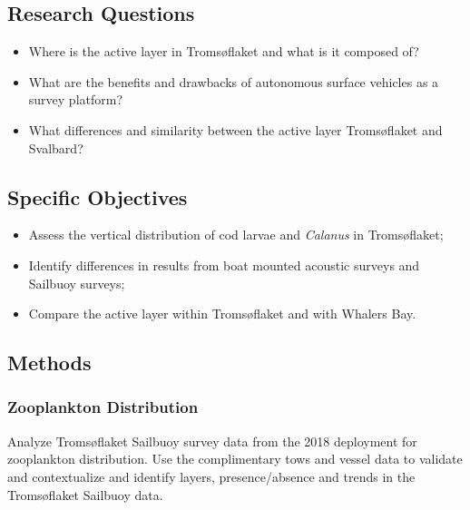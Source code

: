 \documentclass[a4paper, 12pt, Ariel]{article}
\begin{document}
\subsection{Research Questions}
\begin{itemize}
	\item{Where is the active layer in Tromsøflaket and what is it composed of?}
	\item{What are the benefits and drawbacks of autonomous surface vehicles as a survey platform?}
	\item{What differences and similarity between the active layer Tromsøflaket and Svalbard?}
\end{itemize}

\subsection{Specific Objectives}
\begin{itemize}
	\item{Assess the vertical distribution of cod larvae and \textit{Calanus} in Tromsøflaket;}
	\item{Identify differences in results from boat mounted acoustic surveys and Sailbuoy surveys;}
	\item{Compare the active layer within Tromsøflaket and with Whalers Bay.}
\end{itemize}

\subsection{Methods}
\subsubsection {Zooplankton Distribution}
Analyze Tromsøflaket Sailbuoy survey data from the 2018 deployment for zooplankton distribution. Use the complimentary tows and vessel data to validate and contextualize and identify layers, presence/absence and trends in the Tromsøflaket Sailbuoy data.
\end{document}
